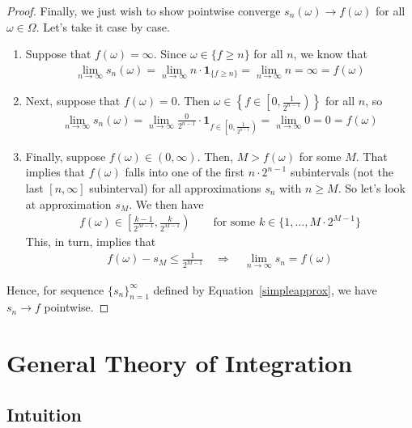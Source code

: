 \documentclass[12pt]{article}
\theoremstyle{plain}
\theoremstyle{definition}
\theoremstyle{remark}
\newcommand{\ra}{\rightarrow}
\newcommand{\one}[1]{\mathbf{1}_{#1}}
\newcommand{\ninf}{_{n=1}^\infty}
\begin{document}
\begin{proof}
Finally, we just wish to show pointwise converge
$s_n(\omega)\rightarrow f(\omega)$ for all $\omega\in \Omega$. Let's
take it case by case.
\begin{enumerate}[label=(\roman*)]
  \item Suppose that $f(\omega)=\infty$. Since $\omega\in \{f\geq n\}$
    for all $n$, we know that
    \begin{align*}
      \lim_{n\rightarrow\infty} s_n(\omega)
      = \lim_{n\rightarrow\infty}
      n\cdot\one{\{f\geq n\}}
      = \lim_{n\rightarrow\infty} n = \infty = f(\omega)
    \end{align*}
  \item Next, suppose that $f(\omega) = 0$. Then
    $\omega\in \left\{f \in \left[0,\frac{1}{2^{n-1}}\right)\right\}$
    for all $n$, so
    \begin{align*}
      \lim_{n\rightarrow\infty} s_n(\omega)
      = \lim_{n\rightarrow\infty}
      \frac{0}{2^{n-1}}\cdot\one{f \in \left[0,\frac{1}{2^{n-1}}\right)} =
      \lim_{n\rightarrow\infty} 0 = 0 = f(\omega)
    \end{align*}
  \item Finally, suppose $f(\omega)\in(0,\infty)$. Then, $M>f(\omega)$
    for some $M$. That implies that $f(\omega)$ falls into one of the
    first $n\cdot 2^{n-1}$ subintervals (not the last $[n,\infty]$
    subinterval) for all approximations $s_n$ with $n\geq M$. So let's
    look at approximation $s_M$. We then have
    \begin{align*}
      f(\omega) \in \left[\frac{k-1}{2^{M-1}}, \frac{k}{2^{M-1}}\right)
          \qquad
      \text{for some $k\in\{1,\ldots,M\cdot 2^{M-1}\}$}
    \end{align*}
    This, in turn, implies that
    \begin{align*}
      f(\omega) - s_M \leq \frac{1}{2^{M-1}}
      \quad \Rightarrow\quad
      \lim_{n\rightarrow\infty}  s_n  =
      f(\omega)
    \end{align*}
\end{enumerate}
Hence, for sequence $\{s_n\}\ninf$ defined by
Equation~\ref{simpleapprox}, we have $s_n\ra f$ pointwise.
\end{proof}

\clearpage
\section{General Theory of Integration}

\subsection{Intuition}
\end{document}
